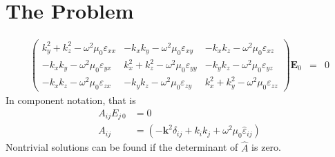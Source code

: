 \documentclass[12pt,a4paper,twoside,openright,BCOR10mm,headsepline,titlepage,abstracton,chapterprefix,final]{scrreprt}
\newcommand\Vector[1]{{\mathbf{#1}}}
\newcommand\vacuum{0}
\newcommand\wavenumber{k}
\newcommand\Tensor[1]{\hat{#1}}
\newcommand\scalarEfield{E}
\newcommand\Efield{\Vector{\scalarEfield}}
\newcommand\vacuumpermeability{\scalarpermeability_{\vacuum}}
\newcommand\scalarpermeability{\mu}
\newcommand\permittivity{\Tensor{\scalarpermittivity}}
\newcommand\scalarpermittivity{\varepsilon}
\begin{document}
\section{The Problem}
\begin{eqnarray}
\begin{pmatrix}
 \wavenumber_y^2 + \wavenumber_z^2 - \omega^2 \vacuumpermeability \scalarpermittivity_{xx} 
 &
 - \wavenumber_x \wavenumber_y - \omega^2 \vacuumpermeability \scalarpermittivity_{xy}
 &
 - \wavenumber_x \wavenumber_z - \omega^2 \vacuumpermeability \scalarpermittivity_{xz}
 \\
 - \wavenumber_x \wavenumber_y - \omega^2 \vacuumpermeability \scalarpermittivity_{yx}
 &
 \wavenumber_x^2 + \wavenumber_z^2 - \omega^2 \vacuumpermeability \scalarpermittivity_{yy} 
 &
 - \wavenumber_y \wavenumber_z - \omega^2 \vacuumpermeability \scalarpermittivity_{yz}
 \\
 - \wavenumber_x \wavenumber_z - \omega^2 \vacuumpermeability \scalarpermittivity_{zx}
 &
 - \wavenumber_y \wavenumber_z - \omega^2 \vacuumpermeability \scalarpermittivity_{zy}
 &
 \wavenumber_x^2 + \wavenumber_y^2 - \omega^2 \vacuumpermeability \scalarpermittivity_{zz}  
\end{pmatrix}
\Efield_0
&=& 0 \label{eq:generalDispersionEigenEquation}
\end{eqnarray}
In component notation, that is
\begin{align}
 A_{ij} E_{j\,0} &= 0 \label{eq:generalDispersionEigenEquationindex}\\
 A_{ij}          &= \left(-\Vector{k}^2 \delta_{ij} + k_i k_j + \omega^2 \vacuumpermeability \permittivity_{ij} \right)
\end{align}
Nontrivial solutions can be found if the determinant of $\hat{A}$ is zero.
\end{document}
